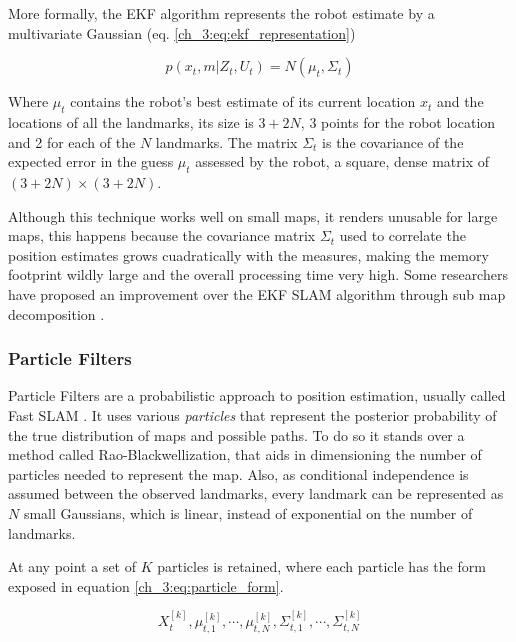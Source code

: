       More formally, the EKF algorithm represents the robot estimate by a multivariate Gaussian (eq. \ref{ch_3:eq:ekf_representation})
      
      \begin{equation} \label{ch_3:eq:ekf_representation}
        p(x_{t}, m | Z_{t}, U_{t}) = N(\mu_{t}, \Sigma_{t})
      \end{equation}

      Where $\mu_{t}$ contains the robot's best estimate of its current location $x_{t}$ and the locations of all the landmarks, its size is $3 + 2N$, 3 points for the robot location and 2 for each of the $N$ landmarks. The matrix $\Sigma_{t}$ is the covariance of the expected error in the guess $\mu_{t}$ assessed by the robot, a square, dense matrix of $(3 + 2N) \times (3 + 2N)$.

      Although this technique works well on small maps, it renders unusable for large maps, this happens because the covariance matrix $\Sigma_{t}$ used to correlate the position estimates grows cuadratically with the measures, making the memory footprint wildly large and the overall processing time very high. Some researchers have proposed an improvement over the EKF SLAM algorithm through sub map decomposition \cite{Guivant2001, Leonard2000}.

    \subsubsection{Particle Filters}

      Particle Filters are a probabilistic approach to position estimation, usually called Fast SLAM \cite{Montemerlo2002}. It uses various \textit{particles} that represent the posterior probability of the true distribution of maps and possible paths. To do so it stands over a method called Rao-Blackwellization, that aids in dimensioning the number of particles needed to represent the map. Also, as conditional independence is assumed between the observed landmarks, every landmark can be represented as $N$ small Gaussians, which is linear, instead of exponential on the number of landmarks.

      At any point a set of $K$ particles is retained, where each particle has the form exposed in equation \ref{ch_3:eq:particle_form}.

      \begin{equation} \label{ch_3:eq:particle_form}
        X_{t}^{[k]}, \mu_{t,1}^{[k]}, \cdots, \mu_{t,N}^{[k]}, \Sigma_{t,1}^{[k]}, \cdots, \Sigma_{t,N}^{[k]}
      \end{equation}

